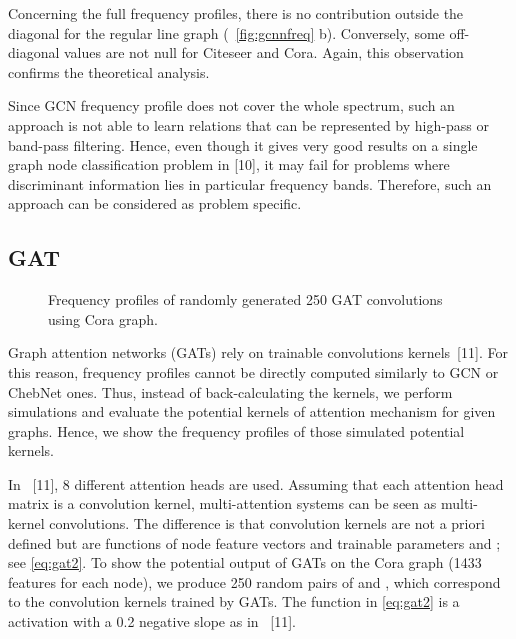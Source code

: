 \documentclass{article}
\begin{document}
Concerning the full frequency profiles, there is no contribution outside the diagonal for the regular line graph (\figurename ~\ref{fig:gcnnfreq} b). Conversely, some off-diagonal values are not null for Citeseer and Cora. Again, this observation confirms the  theoretical analysis. 

Since GCN frequency profile does not cover the whole spectrum, such an approach is not able to learn relations that can be represented by high-pass or band-pass filtering. Hence, even though it gives very good results on a single graph node classification problem in [10], it may fail for problems where discriminant information lies in particular frequency bands. Therefore, such an approach can be considered as problem specific. 

\subsection*{GAT }
\begin{figure*}
  \centering

  
  \caption{Frequency profiles of randomly generated 250 GAT convolutions using Cora graph.}
\label{fig:gatfreqz}
\medskip
\end{figure*}

Graph attention networks (GATs) rely on trainable convolutions kernels~[11]. For this reason, frequency profiles cannot be directly computed similarly to GCN or ChebNet ones. Thus, instead of back-calculating the kernels, we perform simulations and evaluate the potential kernels of attention mechanism for given graphs. Hence, we show the frequency profiles of those simulated potential kernels. 

In ~[11], 8 different attention heads are used. Assuming that each attention head matrix is a convolution kernel, multi-attention systems can be seen as multi-kernel convolutions. The difference is that convolution kernels are not a priori defined but are functions of node feature vectors and trainable parameters  and ; see \eqref{eq:gat2}. 
To show the potential output of GATs on the Cora graph (1433 features for each node), we produce 250 random pairs  of  and , which correspond to the convolution kernels trained by GATs. The  function in \eqref{eq:gat2} is a  activation with a 0.2 negative slope as in ~[11]. 
\end{document}

